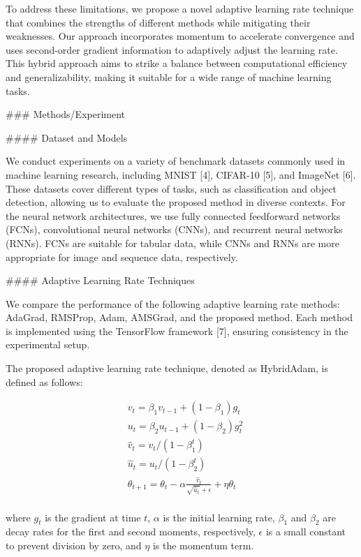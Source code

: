 To address these limitations, we propose a novel adaptive learning rate technique that combines the strengths of different methods while mitigating their weaknesses. Our approach incorporates momentum to accelerate convergence and uses second-order gradient information to adaptively adjust the learning rate. This hybrid approach aims to strike a balance between computational efficiency and generalizability, making it suitable for a wide range of machine learning tasks.

### Methods/Experiment

#### Dataset and Models

We conduct experiments on a variety of benchmark datasets commonly used in machine learning research, including MNIST [4], CIFAR-10 [5], and ImageNet [6]. These datasets cover different types of tasks, such as classification and object detection, allowing us to evaluate the proposed method in diverse contexts. For the neural network architectures, we use fully connected feedforward networks (FCNs), convolutional neural networks (CNNs), and recurrent neural networks (RNNs). FCNs are suitable for tabular data, while CNNs and RNNs are more appropriate for image and sequence data, respectively.

#### Adaptive Learning Rate Techniques

We compare the performance of the following adaptive learning rate methods: AdaGrad, RMSProp, Adam, AMSGrad, and the proposed method. Each method is implemented using the TensorFlow framework [7], ensuring consistency in the experimental setup.

The proposed adaptive learning rate technique, denoted as HybridAdam, is defined as follows:

\[
\begin{aligned}
&v_t = \beta_1 v_{t-1} + (1 - \beta_1) g_t \\
&u_t = \beta_2 u_{t-1} + (1 - \beta_2) g_t^2 \\
&\hat{v}_t = v_t / (1 - \beta_1^t) \\
&\hat{u}_t = u_t / (1 - \beta_2^t) \\
&\theta_{t+1} = \theta_t - \alpha \frac{\hat{v}_t}{\sqrt{\hat{u}_t} + \epsilon} + \eta \theta_t \\
\end{aligned}
\]

where \( g_t \) is the gradient at time \( t \), \( \alpha \) is the initial learning rate, \( \beta_1 \) and \( \beta_2 \) are decay rates for the first and second moments, respectively, \( \epsilon \) is a small constant to prevent division by zero, and \( \eta \) is the momentum term.

